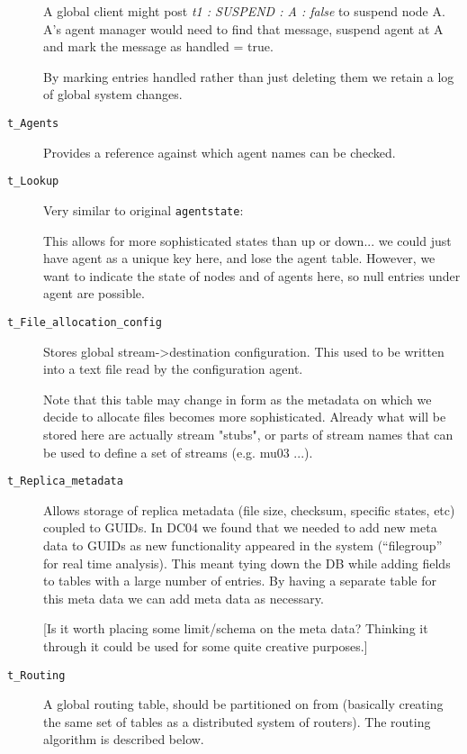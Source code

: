 \documentclass{cmspaper}
\begin{document}
\begin{description}
    A global client might post {\em t1 : SUSPEND : A : false} to suspend
    node A.  A's agent manager would need to find that message, suspend
    agent at A and mark the message as handled = true.

    By marking entries handled rather than just deleting them we
    retain a log of global system changes.

  \item [\texttt{t\_Agents}]\mbox{}

    Provides a reference against which agent names can be checked.

  \item [\texttt{t\_Lookup}]\mbox{}

    Very similar to original \texttt{agentstate}:
    {\em <Node name : agent name : state : last contact>}

    This allows for more sophisticated states than up or down... we
    could just have agent as a unique key here, and lose the agent
    table.  However, we want to indicate the state of nodes and of
    agents here, so null entries under agent are possible.

  \item [\texttt{t\_File\_allocation\_config}]\mbox{}

    Stores global stream->destination configuration.  This used to be
    written into a text file read by the configuration agent.
    
    Note that this table may change in form as the metadata on which we
    decide to allocate files becomes more sophisticated. Already what will
    be stored here are actually stream "stubs", or parts of stream names
    that can be used to define a set of streams (e.g. mu03 ...).

  \item [\texttt{t\_Replica\_metadata}]\mbox{}

    Allows storage of replica metadata (file size, checksum, specific
    states, etc) coupled to GUIDs.  In DC04 we found that we needed to
    add new meta data to GUIDs as new functionality appeared in the
    system (``filegroup'' for real time analysis).  This meant tying
    down the DB while adding fields to tables with a large number of
    entries.  By having a separate table for this meta data we can add
    meta data as necessary.

    [Is it worth placing some limit/schema on the meta data?  Thinking
    it through it could be used for some quite creative purposes.]

  \item [\texttt{t\_Routing}]\mbox{}

    A global routing table, should be partitioned on from (basically
    creating the same set of tables as a distributed system of
    routers).  The routing algorithm is described below.
\end{description}
\end{document}
